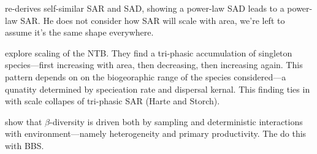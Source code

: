 \documentclass[12pt]{article}
\begin{document}
\citet{pueyo2006} re-derives self-similar SAR and SAD, showing a
power-law SAD leads to a power-law SAR.  He does not consider how SAR
will scale with area, we're left to assume it's the same shape
everywhere.

\citet{rosindell2013} explore scaling of the NTB.  They find a
tri-phasic accumulation of singleton species---first increasing with
area, then decreasing, then increasing again.  This pattern depends on
on the biogeoraphic range of the species considered---a qunatity
determined by specieation rate and dispersal kernal.  This finding
ties in with scale collapes of tri-phasic SAR (Harte and Storch).

\citet{stegen2013} show that $\beta$-diversity is driven both by
sampling and deterministic interactions with environment---namely
heterogeneity and primary productivity.  The do this with BBS.




\end{document}
